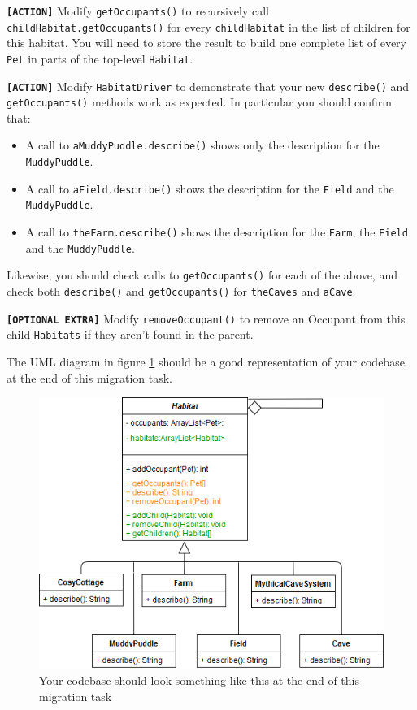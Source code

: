 \documentclass[
]{book}
\providecommand{\tightlist}{%
  \setlength{\itemsep}{0pt}\setlength{\parskip}{0pt}}
\begin{document}
\textbf{\texttt{{[}ACTION{]}}} Modify \texttt{getOccupants()} to recursively call \texttt{childHabitat.getOccupants()} for every \texttt{childHabitat} in the list of children for this habitat. You will need to store the result to build one complete list of every \texttt{Pet} in parts of the top-level \texttt{Habitat}.

\textbf{\texttt{{[}ACTION{]}}} Modify \texttt{HabitatDriver} to demonstrate that your new \texttt{describe()} and \texttt{getOccupants()} methods work as expected. In particular you should confirm that:

\begin{itemize}
\tightlist
\item
  A call to \texttt{aMuddyPuddle.describe()} shows only the description for the \texttt{MuddyPuddle}.
\item
  A call to \texttt{aField.describe()} shows the description for the \texttt{Field} and the \texttt{MuddyPuddle}.
\item
  A call to \texttt{theFarm.describe()} shows the description for the \texttt{Farm}, the \texttt{Field} and the \texttt{MuddyPuddle}.
\end{itemize}

Likewise, you should check calls to \texttt{getOccupants()} for each of the above, and check both \texttt{describe()} and \texttt{getOccupants()} for \texttt{theCaves} and \texttt{aCave}.

\textbf{\texttt{{[}OPTIONAL\ EXTRA{]}}} Modify \texttt{removeOccupant()} to remove an Occupant from this child \texttt{Habitats} if they aren't found in the parent.

The UML diagram in figure \ref{fig:composite-fig} should be a good representation of your codebase at the end of this migration task.

\begin{figure}

{\centering \includegraphics[width=1\linewidth]{images/HabitatComposite} 

}

\caption{Your codebase should look something like this at the end of this migration task}\label{fig:composite-fig}
\end{figure}
\end{document}
